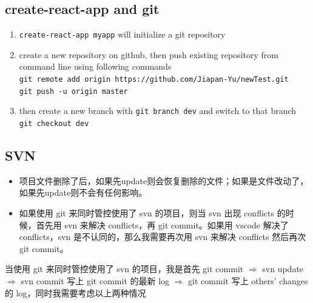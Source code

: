 \documentclass[a4paper, 12pt]{article}
\begin{document}
\subsection{create-react-app and git}
\begin{enumerate}
\item \verb|create-react-app myapp| will initialize a git repository

\item create a new repository on github, then push existing repository from command line using following commands\\
\verb|git remote add origin https://github.com/Jiapan-Yu/newTest.git|\\
\verb|git push -u origin master|

\item then create a new branch with \verb|git branch dev| and switch to that branch\\ \verb|git checkout dev|

\end{enumerate}

\subsection{SVN}
\begin{itemize}
\item 项目文件删除了后，如果先update则会恢复删除的文件；如果是文件改动了，如果先update则不会有任何影响。

\item 如果使用 git 来同时管控使用了 svn 的项目，则当 svn 出现 conflicts 的时候，首先用 svn 来解决 conflicts，再 git commit。如果用 vscode 解决了 conflicts，svn 是不认同的，那么我需要再次用 svn 来解决 conflicts 然后再次 git commit。

\end{itemize}

当使用 git 来同时管控使用了 svn 的项目，我是首先 git commit $\Rightarrow$ svn update $\Rightarrow$ svn commit 写上 git commit 的最新 log $\Rightarrow$ git commit 写上 others' changes 的 log，{\color{red}同时}我需要考虑以上两种情况
\end{document}
